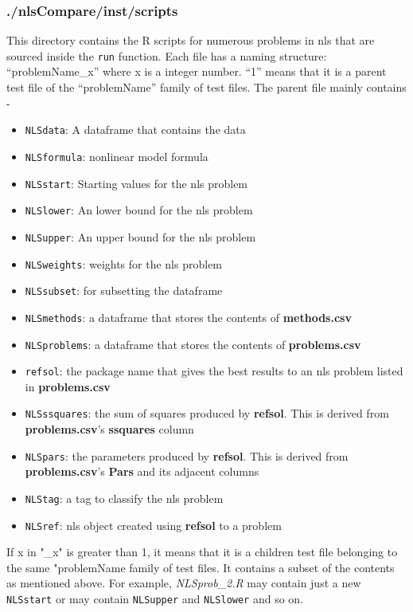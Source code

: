 \hypertarget{nlscompareinstscripts}{%
\subsubsection{./nlsCompare/inst/scripts}\label{nlscompareinstscripts}}

This directory contains the R scripts for numerous problems in nls that
are sourced inside the \texttt{run} function. Each file has a naming
structure: ``problemName\_x'' where x is a integer number. ``1'' means
that it is a parent test file of the ``problemName'' family of test
files. The parent file mainly contains -

\begin{itemize}
\tightlist
\item
  \texttt{NLSdata}: A dataframe that contains the data
\item
  \texttt{NLSformula}: nonlinear model formula
\item
  \texttt{NLSstart}: Starting values for the nls problem
\item
  \texttt{NLSlower}: An lower bound for the nls problem
\item
  \texttt{NLSupper}: An upper bound for the nls problem
\item
  \texttt{NLSweights}: weights for the nls problem
\item
  \texttt{NLSsubset}: for subsetting the dataframe
\item
  \texttt{NLSmethods}: a dataframe that stores the contents of
  \textbf{methods.csv}
\item
  \texttt{NLSproblems}: a dataframe that stores the contents of
  \textbf{problems.csv}
\item
  \texttt{refsol}: the package name that gives the best results to an
  nls problem listed in \textbf{problems.csv}
\item
  \texttt{NLSssquares}: the sum of squares produced by \textbf{refsol}.
  This is derived from \textbf{problems.csv}'s \textbf{ssquares} column
\item
  \texttt{NLSpars}: the parameters produced by \textbf{refsol}. This is
  derived from \textbf{problems.csv}'s \textbf{Pars} and its adjacent
  columns
\item
  \texttt{NLStag}: a tag to classify the nls problem
\item
  \texttt{NLSref}: nls object created using \textbf{refsol} to a problem
\end{itemize}

If x in "\_x" is greater than 1, it means that it is a children test
file belonging to the same "problemName family of test files. It
contains a subset of the contents as mentioned above. For example,
\emph{NLSprob\_2.R} may contain just a new \texttt{NLSstart} or may
contain \texttt{NLSupper} and \texttt{NLSlower} and so on.

